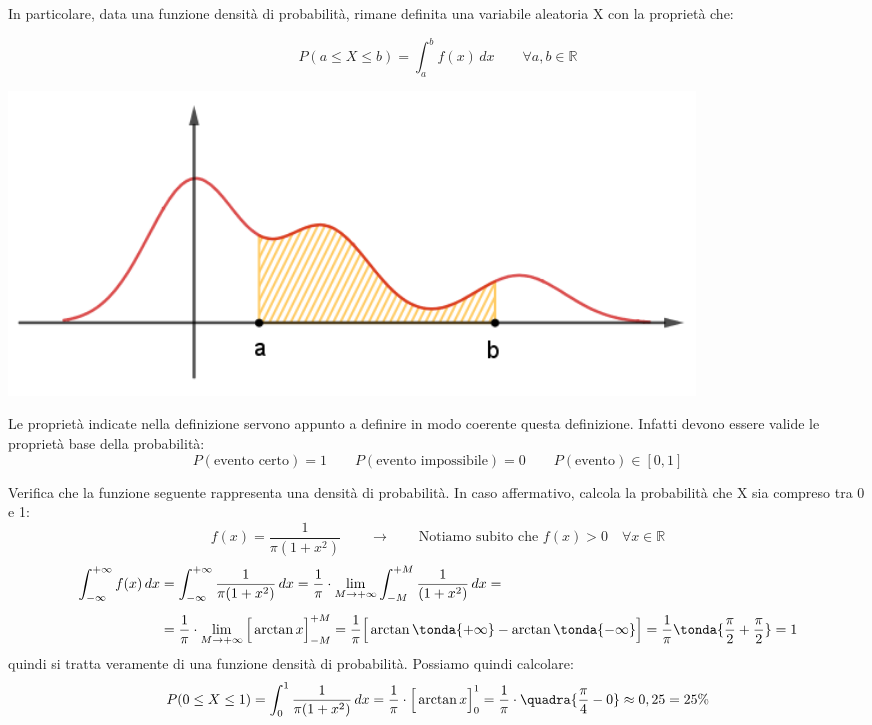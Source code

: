 In particolare, data una funzione densità di probabilità, rimane definita una variabile aleatoria X con la proprietà che:\\
\begin{minipage}[c]{.5\textwidth}
\[P(a \leq X \leq b) = \int_a^b f(x)\,dx \qquad \forall a,b \in \mathbb{R}\]
\end{minipage}
\begin{minipage}[c]{.5\textwidth}
\begin{center}
  \includegraphics[width=0.8\textwidth]{img/Probabilita.png}
\end{center}
\end{minipage}


Le proprietà indicate nella definizione servono appunto a definire in modo coerente questa definizione. Infatti devono essere valide le proprietà base della probabilità:
\[P(\text{evento certo}) = 1 \qquad P(\text{evento impossibile}) = 0 \qquad P(\text{evento}) \in [0,1] \]

\begin{esempio}
Verifica che la funzione seguente rappresenta una densità di probabilità. In caso affermativo, calcola la probabilità che X sia compreso tra 0 e 1:\[f(x)= \dfrac{1}{\pi (1+x^2)} \qquad \longrightarrow \qquad \text{Notiamo subito che $f(x)>0 \quad\forall x \in \mathbb{R}$}\]
\[ \begin{split}\int_{-\infty}^{+\infty} f(x)\, dx &=\int_{-\infty}^{+\infty} \dfrac{1}{\pi (1+x^2)}\, dx = \dfrac{1}{\pi}\cdot \lim_{M \rightarrow +\infty} \int_{-M}^{+M} \dfrac{1}{ (1+x^2)}\, dx = \\[5pt]
&= \dfrac{1}{\pi}\cdot \lim_{M \rightarrow +\infty} \Big[\arctan{x}\Big]_{-M}^{+M} = \dfrac{1}{\pi} \Big[\arctan{\tonda{+\infty}}-\arctan{\tonda{-\infty}}\Big] = \dfrac{1}{\pi} \tonda{\dfrac{\pi}{2}+\dfrac{\pi}{2}} = 1 \end{split}\]
quindi si tratta veramente di una funzione densità di probabilità. Possiamo quindi calcolare:
\[P(0\leq X\leq 1)  = \int_0^1\dfrac{1}{\pi (1+x^2)}\, dx =  \dfrac{1}{\pi} \cdot \Big[\arctan{x}\Big]_{0}^1 = \dfrac{1}{\pi} \cdot \quadra{\dfrac{\pi}{4}-0} \approx 0,25 = 25 \%\]
\end{esempio}

